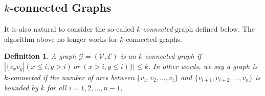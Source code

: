 \documentclass{aamas2015}
\newtheorem{definition}{Definition}
\begin{document}
%
%
%

\subsection{$k$-connected Graphs}


It is also natural to consider the so-called {\em $k$-connected} graph defined below. The algorithm above no longer works for $k$-connected graphs.

\begin{definition}\label{def:lcg}
	A graph $\mathcal{G}=(\mathcal{V},\mathcal{E})$ is an $k$-connected graph if $|\{v_xv_y|(x\leq i,y>i)~or~(x>i,y\leq i)\}|\leq k$.
	In other words, we say a graph is $k$-connected if the number of arcs between $\{v_1,v_2,\ldots,v_i\}$ and $\{v_{i+1},v_{i+2},\ldots,v_n\}$ is bounded by $k$ for all $i=1,2,\ldots,n-1$,
\end{definition}
\end{document}
